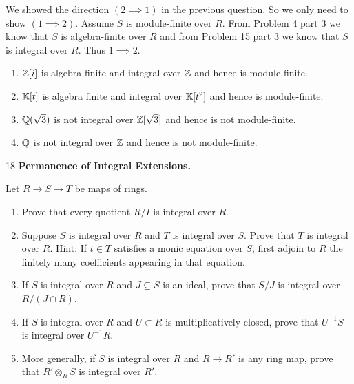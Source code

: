 \documentclass[Notebook.tex]{subfiles}
\begin{document}
\begin{solution}
    \bbni 

    We showed the direction $(2 \implies 1)$ in the previous question. So we only need to show $(1 \implies 2)$. Assume $S$ is module-finite over $R$. From Problem 4 part 3 we know that $S$ is algebra-finite over $R$ and from Problem 15 part 3 we know that $S$ is integral over $R$. Thus $1 \implies 2$. 

    \begin{enumerate}
        \item $\mathbb Z[i]$ is algebra-finite and integral over $\mathbb Z$ and hence is module-finite. 
        \item $\mathbb K[t]$ is algebra finite and integral over $\mathbb K[t^2]$ and hence is module-finite. 
        \item $\mathbb Q(\sqrt{3})$ is not integral over $\mathbb Z[\sqrt{3}]$ and hence is not module-finite. 
        \item $\mathbb Q$ is not integral over $\mathbb Z$ and hence is not module-finite. 
    \end{enumerate}
\end{solution}

\newpage 

\begin{problem}{18} \textbf{Permanence of Integral Extensions.} 
    
    Let $R\to S\to T$ be maps of rings.
    \begin{enumerate}
        \item Prove that every quotient $R/I$ is integral over $R$.
        \item Suppose $S$ is integral over $R$ and $T$ is integral over $S$. Prove that $T$ is integral over $R$. Hint: If $t\in T$ satisfies a monic equation over $S$, first adjoin to $R$ the finitely many coefficients appearing in that equation.
        \item If $S$ is integral over $R$ and $J\subseteq S$ is an ideal, prove that $S/J$ is integral over $R/(J\cap R)$.
        \item If $S$ is integral over $R$ and $U\subset R$ is multiplicatively closed, prove that $U^{-1}S$ is integral over $U^{-1}R$.
        \item More generally, if $S$ is integral over $R$ and $R\to R'$ is any ring map, prove that $R'\otimes_R S$ is integral over $R'$.
    \end{enumerate}
\end{problem}
\end{document}
